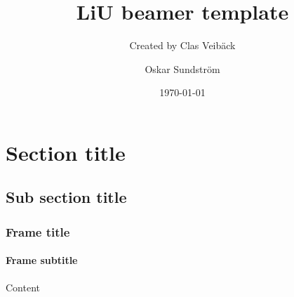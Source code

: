 \documentclass[noamsthm, english]{beamer}
\title[LiU beamer]{LiU beamer template}
\subtitle{Created by Clas Veibäck}
\author{Oskar Sundström}
\institute{Your division\\ 
Your department \\ 
Linköping University}
\date{\today}
\begin{document}
\maketitle
\makeoutline

\section{Section title}
\subsection{Sub section title}

\begin{frame}
\frametitle{Frame title}
\framesubtitle{Frame subtitle}
Content
\end{frame}
\end{document}
